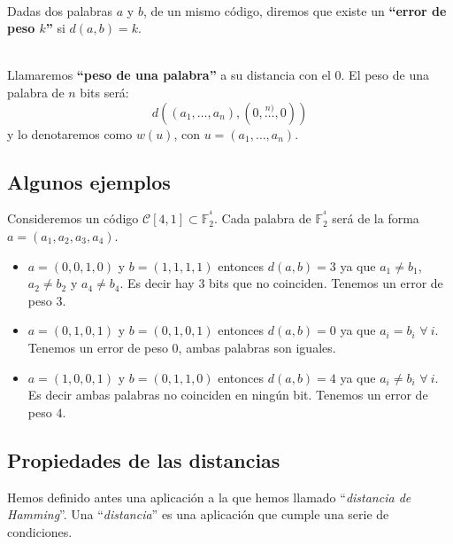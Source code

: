 \begin{definicion}
\ \\
Dadas dos palabras $a$ y $b$, de un mismo c\'odigo, diremos que existe un
\textbf{``error de peso $k$''} si $d(a,b) = k$.
\end{definicion}
\begin{definicion}
\ \\
Llamaremos \textbf{``peso de una palabra''} a su distancia con el $0$. El peso
de una palabra de $n$ bits ser\'a:
\begin{displaymath}
d((a_1,\dots ,a_n),(0,\stackrel{n)} \ldots ,0))
\end{displaymath}
y lo denotaremos como $w(u)$, con $u=(a_1,\dots,a_n)$.
\end{definicion}

\subsection{Algunos ejemplos}

Consideremos un c\'odigo $\mathcal{C}[4,1]\subset{\mathbb{F}^{^4}_2}$. Cada
palabra de $\mathbb{F}^{^4}_2$ ser\'a de la forma $a=(a_1,a_2,a_3,a_4)$.
\begin{itemize}
\item $a=(0,0,1,0)$ y $b=(1,1,1,1)$ entonces $d(a,b) = 3$ ya que $a_1\neq b_1$,
$a_2\neq b_2$ y $a_4\neq b_4$. Es decir hay $3$ bits que no coinciden. Tenemos
un error de peso $3$.
\item $a=(0,1,0,1)$ y $b=(0,1,0,1)$ entonces $d(a,b) = 0$ ya que $a_i=b_i$
$\forall \ i$. Tenemos un error de peso $0$, ambas palabras son iguales.
\item $a=(1,0,0,1)$ y $b=(0,1,1,0)$ entonces $d(a,b) = 4$  ya que $a_i\neq b_i$
$\forall \ i$. Es decir ambas palabras no coinciden en ning\'un bit. Tenemos
un error de peso $4$.
\end{itemize}

\subsection{Propiedades de las distancias}

Hemos definido antes una aplicaci\'on a la que hemos llamado ``\emph{distancia
de Hamming}''. Una ``\emph{distancia}'' es una aplicaci\'on que cumple una
serie de condiciones.\\

